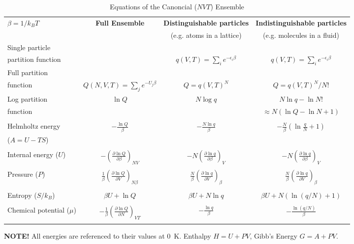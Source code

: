 \documentclass[11pt]{article}
\begin{document}
\begin{table}\small
  \begin{center}
    \caption{Equations of the Canoncial ($NVT$) Ensemble}
    \label{Canonical}
    \begin{tabular}[h]{lccc}
      \hline
$\beta=1/k_BT$ & {\bf Full Ensemble} & {\bf Distinguishable particles} & {\bf Indistinguishable
particles} \\
               &               & (e.g. atoms in a lattice) & (e.g. molecules in
               a fluid) \\
\hline
Single particle & & & \\partition function& & $\displaystyle q(V,T) = \sum_i
e^{-\epsilon_i\beta} $& $\displaystyle q(V,T) = \sum_i e^{-\epsilon_i\beta} $ \\
Full partition & & & \\function & $\displaystyle Q(N,V,T) = \sum_j e^{-U_j\beta} $ &
$\displaystyle Q = q(V,T)^N $ & $\displaystyle Q = q(V,T)^N/N! $ \\
Log partition &  $\ln Q$ & $N\log q$ & $ N\ln q - \ln N! $\\
function & & & $\approx N(\ln Q - \ln N +1)$ \\ & & & \\
Helmholtz energy & $\displaystyle -\frac{\ln Q}{\beta}$ & $\displaystyle
-\frac{N\ln q}{\beta}$ & $\displaystyle -\frac{N}{\beta}\left (\ln\frac{q}{N} +
  1 \right ) $ \\
($A=U-TS$) & & & \\ & & &  \\
Internal energy ($U$)& $\displaystyle -\left (\frac{\partial\ln
    Q}{\partial\beta}\right )_{NV}$ & $\displaystyle -N\left (\frac{\partial\ln
    q}{\partial\beta}\right )_{V}$ &  $\displaystyle -N\left (\frac{\partial\ln
    q}{\partial\beta}\right )_{V}$ \\ & & & \\
Pressure ($P$) & $\displaystyle \frac{1}{\beta}\left (\frac{\partial\ln
    Q}{\partial V}\right )_{N\beta}$ & $\displaystyle \frac{N}{\beta}\left (\frac{\partial\ln
    q}{\partial V}\right )_{\beta}$ &  $\displaystyle \frac{N}{\beta}\left (\frac{\partial\ln
    q}{\partial V}\right )_{\beta}$ \\ & & & \\

Entropy ($S/k_B$) & $ \beta U + \ln Q$ & $\beta U + N \ln q$ & $\beta U +
N\left ( \ln(q/N) + 1\right )$ \\ & & & \\
Chemical potential ($\mu$) & $\displaystyle -\frac{1}{\beta}\left ( \frac{\partial \ln
    Q}{\partial N}\right )_{VT} $& $\displaystyle -\frac{\ln q}{\beta}$ & $\displaystyle
-\frac{\ln (q/N)}{\beta}$ \\ & & & \\
\hline
    \end{tabular}
{\bf NOTE!} All energies are referenced to their values at 0~K.  Enthalpy $H=U+PV$, Gibb's
Energy $G=A+PV$.
  \end{center}
\end{table}
\end{document}
